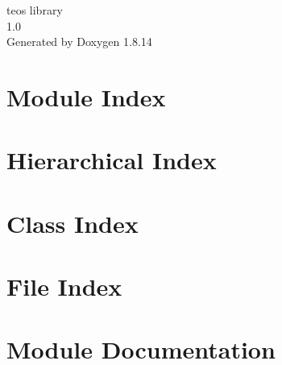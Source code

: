 \documentclass[twoside]{book}
\newcommand{\+}{\discretionary{\mbox{\scriptsize$\hookleftarrow$}}{}{}}
\newcommand{\clearemptydoublepage}{%
  \newpage{\pagestyle{empty}\cleardoublepage}%
}
\begin{document}
\hypersetup{pageanchor=false,
             bookmarksnumbered=true,
             pdfencoding=unicode
            }
\begin{titlepage}
\vspace*{7cm}
\begin{center}%
{\Large teos library \\[1ex]\large 1.\+0 }\\
\vspace*{1cm}
{\large Generated by Doxygen 1.8.14}\\
\end{center}
\end{titlepage}
\clearemptydoublepage
{}
\tableofcontents
\clearemptydoublepage
{}
\hypersetup{pageanchor=true}

\chapter{Module Index}

\chapter{Hierarchical Index}

\chapter{Class Index}

\chapter{File Index}

\chapter{Module Documentation}

\end{document}
